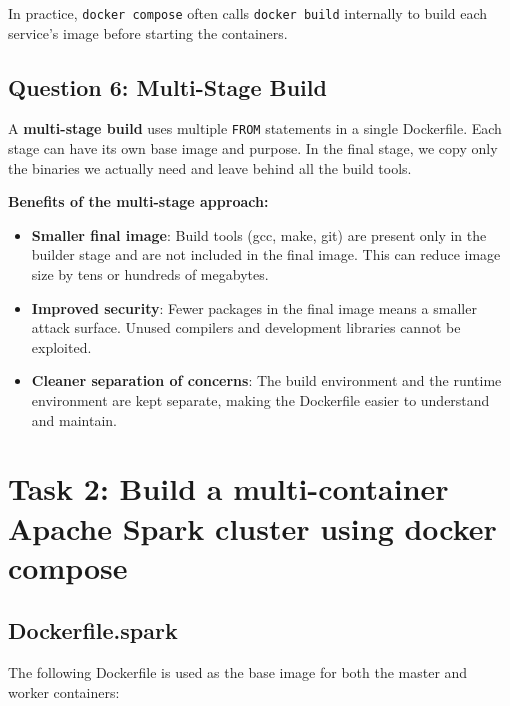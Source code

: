 \documentclass[11pt,a4paper]{article}
\begin{document}
In practice, \texttt{docker compose} often calls \texttt{docker build}
internally to build each service's image before starting the containers.

\subsection{Question 6: Multi-Stage Build}

A \textbf{multi-stage build} uses multiple \texttt{FROM} statements in a
single Dockerfile. Each stage can have its own base image and purpose.
In the final stage, we copy only the binaries we actually need and
leave behind all the build tools.



\textbf{Benefits of the multi-stage approach:}
\begin{itemize}[leftmargin=1.5cm]
  \item \textbf{Smaller final image}: Build tools (gcc, make, git) are
        present only in the builder stage and are not included in the final
        image. This can reduce image size by tens or hundreds of megabytes.
  \item \textbf{Improved security}: Fewer packages in the final image means
        a smaller attack surface. Unused compilers and development libraries
        cannot be exploited.
  \item \textbf{Cleaner separation of concerns}: The build environment and
        the runtime environment are kept separate, making the Dockerfile
        easier to understand and maintain.
\end{itemize}

\section{Task 2: Build a multi-container Apache Spark cluster using docker compose}

\subsection{Dockerfile.spark}

The following Dockerfile is used as the base image for both the master and
worker containers:
\end{document}
